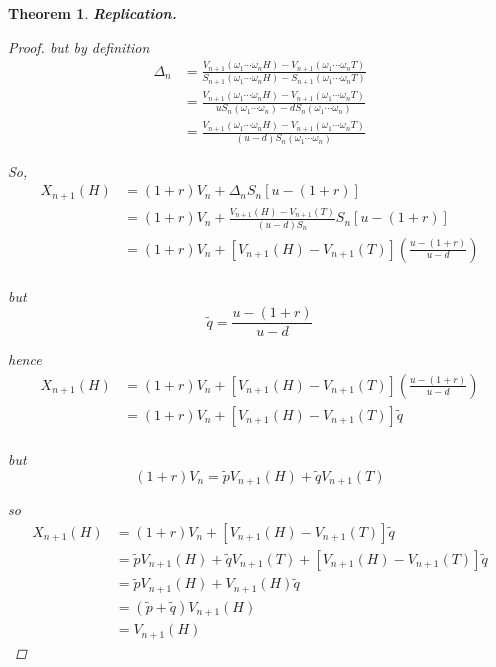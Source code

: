 \documentclass[12pt]{article}
\newtheorem{theorem}{Theorem}
\begin{document}
\begin{theorem} {\bf Replication.}
\begin{proof}
but by definition
\begin{align*}
	\Delta_n &= \frac{V_{n + 1}(\omega_1\cdots\omega_n H) - V_{n + 1}(\omega_1\cdots\omega_n T)}{ S_{n + 1}(\omega_1\cdots\omega_n H) - S_{n + 1}(\omega_1\cdots\omega_n T)} \\
	 &= \frac{V_{n + 1}(\omega_1\cdots\omega_n H) - V_{n + 1}(\omega_1\cdots\omega_n T)}{ u S_n(\omega_1\cdots\omega_n) - d S_n(\omega_1\cdots\omega_n)} \\
	 &= \frac{V_{n + 1}(\omega_1\cdots\omega_n H) - V_{n + 1}(\omega_1\cdots\omega_n T)}{ (u - d) S_n(\omega_1\cdots\omega_n)}
\end{align*}

So,
\begin{align*}
	X_{n + 1}(H) &= (1 + r)V_n + \Delta_n S_n [u - (1 + r)] \\
	&= (1 + r)V_n + \frac{V_{n + 1}(H) - V_{n + 1}(T)}{ (u - d) S_n}S_n [u - (1 + r)] \\                                                                                                                                                                                                                                  
	&= (1 + r)V_n + [V_{n + 1}(H) - V_{n + 1}(T)] \left( \frac{ u - (1 + r)}{ u - d }\right) \\                                                                                                                                                                                                                                  
\end{align*}

but
\begin{equation*}
	\tilde{q} = \frac{u - (1 + r)}{u - d}
\end{equation*}

hence
\begin{align*}
	X_{n + 1}(H) &= (1 + r)V_n + [V_{n + 1}(H) - V_{n + 1}(T)] \left( \frac{ u - (1 + r)}{ u - d }\right) \\ 
	&= (1 + r)V_n + [V_{n + 1}(H) - V_{n + 1}(T)]\tilde{q} \\ 
\end{align*}

but
\begin{equation*}
	(1 + r)V_n = \tilde{p}V_{n + 1}(H) + \tilde{q}V_{n + 1}(T)
\end{equation*}	

so
\begin{align*}
	X_{n + 1}(H) &= (1 + r)V_n + [V_{n + 1}(H) - V_{n + 1}(T)]\tilde{q} \\ 
	&= \tilde{p}V_{n + 1}(H) + \tilde{q}V_{n + 1}(T) + [V_{n + 1}(H) - V_{n + 1}(T)]\tilde{q} \\
	&= \tilde{p}V_{n + 1}(H) + V_{n + 1}(H)\tilde{q} \\
	&= (\tilde{p} + \tilde{q})V_{n + 1}(H) \\
	&= V_{n + 1}(H)
\end{align*}


\end{proof}
\end{theorem}
\end{document}
